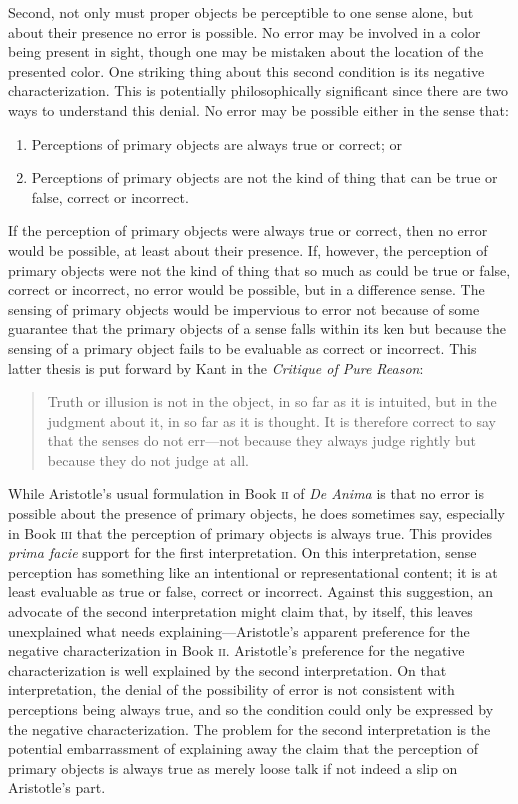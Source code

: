 Second, not only must proper objects be perceptible to one sense alone, but about their presence no error is possible. No error may be involved in a color being present in sight, though one may be mistaken about the location of the presented color. One striking thing about this second condition is its negative characterization. This is potentially philosophically significant since there are two ways to understand this denial. No error may be possible either in the sense that:
\begin{enumerate}[(1)]
	\item Perceptions of primary objects are always true or correct; or
	\item Perceptions of primary objects are not the kind of thing that can be true or false, correct or incorrect.
\end{enumerate}
If the perception of primary objects were always true or correct, then no error would be possible, at least about their presence. If, however, the perception of primary objects were not the kind of thing that so much as could be true or false, correct or incorrect, no error would be possible, but in a difference sense. The sensing of primary objects would be impervious to error not because of some guarantee that the primary objects of a sense falls within its ken but because the sensing of a primary object fails to be evaluable as correct or incorrect. This latter thesis is put forward by Kant in the \emph{Critique of Pure Reason}:
\begin{quote}
	Truth or illusion is not in the object, in so far as it is intuited, but in the judgment about it, in so far as it is thought. It is therefore correct to say that the senses do not err---not because they always judge rightly but because they do not judge at all. \citep[\textsc{a}294/\textsc{b}350]{Kant:1781fk}
\end{quote}

While Aristotle's usual formulation in Book \textsc{ii} of \emph{De Anima} is that no error is possible about the presence of primary objects, he does sometimes say, especially in Book \textsc{iii} that the perception of primary objects is always true. This provides \emph{prima facie} support for the first interpretation. On this interpretation, sense perception has something like an intentional or representational content; it is at least evaluable as true or false, correct or incorrect. Against this suggestion, an advocate of the second interpretation might claim that, by itself, this leaves unexplained what needs explaining---\-Aristotle's apparent preference for the negative characterization in Book \textsc{ii}. Aristotle's preference for the negative characterization is well explained by the second interpretation. On that interpretation, the denial of the possibility of error is not consistent with perceptions being always true, and so the condition could only be expressed by the negative characterization. The problem for the second interpretation is the potential embarrassment of explaining away the claim that the perception of primary objects is always true as merely loose talk if not indeed a slip on Aristotle's part.

